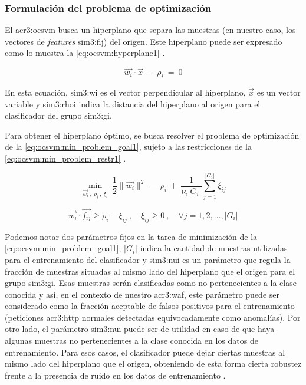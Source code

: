 \subsubsection{Formulación del problema de optimización}

El \gls{acr3:ocsvm} busca un hiperplano que separa las muestras (en
nuestro caso, los vectores de \textit{features} \gls{sim3:fij}) del origen.
Este hiperplano puede ser expresado como lo muestra la
\autoref{eq:ocsvm:hyperplane1}
\citep{parhizkar2015oc}. %

\begin{equation}
    \label{eq:ocsvm:hyperplane1}
    \vec{w_{i}} \cdot \vec{x}
    \ - \
    \rho_{i}
    \ = \
    0
\end{equation}

En esta ecuación, \gls{sim3:wi} es el vector perpendicular al hiperplano,
$\vec{x}$ es un vector variable y \gls{sim3:rhoi} indica la distancia
del hiperplano al origen para el clasificador del grupo \gls{sim3:gi}.

Para obtener el hiperplano óptimo, se busca resolver el problema de
optimización de la \autoref{eq:ocsvm:min_problem_goal1}, sujeto a las
restricciones de la \autoref{eq:ocsvm:min_problem_restr1}
\citep{parhizkar2015oc}. %

\begin{equation}
    \label{eq:ocsvm:min_problem_goal1}
    \min_{
        \vec{w_{i}}
        \ , \
        \rho_{i}
        \ , \
        \xi_{i}
    }
    \
    \frac{1}{2} \lVert {\vec{w_{i}}} \rVert^2
    \ - \
    \rho_{i}
    \ + \
    \frac{1}{\nu_{i} \lvert G_{i} \rvert} \sum_{j=1}^{\lvert G_{i} \rvert} \xi_{ij}
\end{equation}

\begin{equation}
    \label{eq:ocsvm:min_problem_restr1}
    \vec{w_{i}} \cdot \vec{f_{ij}} \geqslant \rho_{i} - \xi_{ij}
    \ , \quad
    \xi_{ij} \geqslant 0
    \ , \quad
    \forall j = 1,2, \dots, \lvert G_{i} \rvert
\end{equation}

Podemos notar dos parámetros fijos en la tarea de minimización de la
\autoref{eq:ocsvm:min_problem_goal1}; $\lvert G_{i} \rvert$ indica la
cantidad de muestras utilizadas para el entrenamiento del clasificador
y \gls{sim3:nui} es un parámetro que regula la fracción de muestras
situadas al mismo lado del hiperplano que el origen para el grupo
\gls{sim3:gi}. Esas muestras serán clasificadas como no pertenecientes
a la clase conocida y así, en el contexto de nuestro \gls{acr3:waf},
este parámetro puede ser considerado como la fracción aceptable de
falsos positivos para el entrenamiento (peticiones \gls{acr3:http}
normales detectadas equivocadamente como anomalías).
Por otro lado, el parámetro \gls{sim3:nui} puede ser de utilidad en caso
de que haya algunas muestras no pertenecientes a la clase conocida en
los datos de entrenamiento. Para esos casos, el clasificador puede dejar
ciertas muestras al mismo lado del hiperplano que el origen, obteniendo
de esta forma cierta robustez frente a la presencia de ruido en los
datos de entrenamiento
\citep{parhizkar2015oc}. %

